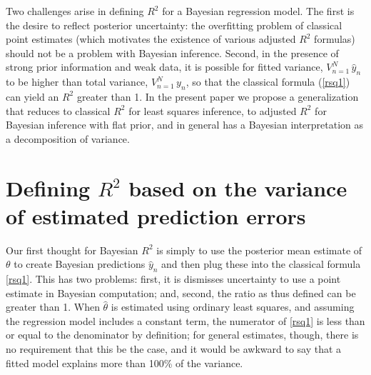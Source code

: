 \documentclass[11pt]{article}
\begin{document}
Two challenges arise in defining $R^2$ for a Bayesian regression model.  The first is the desire to reflect posterior uncertainty:  the overfitting problem of classical point estimates (which motivates the existence of various adjusted $R^2$ formulas) should not be a problem with Bayesian inference.  Second, in the presence of strong prior information and weak data, it is possible for fitted variance, $V_{n=1}^N \,\hat{y}_n$  to be higher than total variance, $V_{n=1}^N \,y_n$, so that the classical formula (\ref{rsq1}) can yield an $R^2$ greater than 1.  In the present paper we propose a generalization that reduces to classical $R^2$ for least squares inference, to adjusted $R^2$ for Bayesian inference with flat prior, and in general has a Bayesian interpretation as a decomposition of variance.

\section{Defining $R^2$ based on the variance of estimated prediction errors}

Our first thought for Bayesian $R^2$ is simply to use the posterior mean
estimate of $\theta$ to create Bayesian predictions $\hat{y}_n$ and then plug
these into the classical formula \eqref{rsq1}.  This has two problems:  first,
it is dismisses uncertainty to use a point estimate in Bayesian computation;
and, second, the ratio as thus defined can be greater than 1.  When
$\hat{\theta}$ is estimated using ordinary least squares, and assuming the
regression model includes a constant term, the numerator of \eqref{rsq1} is less
than or equal to the denominator by definition; for general estimates, though, there is
no requirement that this be the case, and it would be awkward to say that a
fitted model explains more than 100\% of the variance.
\end{document}
